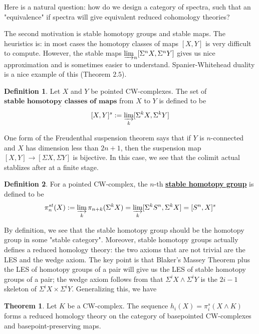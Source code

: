 \documentclass{article}
\theoremstyle{definition}
\newtheorem{theorem}{Theorem}[section]
\theoremstyle{definition}
\newtheorem{definition}{Definition}[theorem]
\theoremstyle{definition}
\theoremstyle{definition}
\theoremstyle{definition}
\theoremstyle{definition}
\theoremstyle{definition}
\begin{document}
Here is a natural question: how do we design a category of spectra, such that an "equivalence" if spectra will give equivalent reduced cohomology theories?

The second motivation is stable homotopy groups and stable maps. The heuristics is: in most cases the homotopy classes of maps $[X,Y]$ is very difficult to compute. However, the stable maps $\varinjlim_n[\Sigma^nX,\Sigma^n Y]$ gives us nice approximation and is sometimes easier to understand. Spanier-Whitehead duality is a nice example of this (Theorem $2.5$). 


\begin{tcolorbox}[colback=purple!5!white,colframe=purple!75!black]
\begin{definition}
Let $X$ and $Y$ be pointed CW-complexes. The set of $\underline{\textbf{stable homotopy classes of maps}}$ from $X$ to $Y$ is defined to be 
\[[X,Y]^s:= \varinjlim_{k}[\Sigma^k X, \Sigma^k Y] \]
\end{definition}
\end{tcolorbox}
One form of the Freudenthal suspension theorem says that if $Y$ is $n$-connected and $X$ has dimension less than $2n+1$, then the suspension map $[X,Y]\to [\Sigma X,\Sigma Y]$ is bijective. In this case, we see that the colimit actual stablizes after at a finite stage. 

\begin{tcolorbox}[colback=purple!5!white,colframe=purple!75!black]
\begin{definition}
For a pointed CW-complex, the $n$-th \underline{\textbf{stable homotopy group}} is defined to be 
\[\pi_n^{st}(X):=\varinjlim_{k}\pi_{n+k}(\Sigma^k X)=\varinjlim_{k}[\Sigma^k S^n, \Sigma^k X]=[S^n,X]^s\]
\end{definition}
\end{tcolorbox}
By definition, we see that the stable homotopy group should be the homotopy group in some "stable category". Moreover, stable homotopy groups actually defines a reduced homology theory: the two axioms that are not trivial are the LES and the wedge axiom. The key point is that Blaker's Massey Theorem plus the LES of homotopy groups of a pair will give us the LES of stable homotopy groups of a pair; the wedge axiom follows from that $\Sigma^i X\wedge \Sigma^i Y$ is the $2i-1$ skeleton of  $\Sigma^i X\times \Sigma^i Y$. Generalizing this, we have 

\begin{tcolorbox}[colback=red!5!white,colframe=red!30!white]
\begin{theorem}
    Let $K$ be a CW-complex. The sequence $h_i(X) = \pi^s_i(X \wedge K)$ forms a reduced homology theory on the category of basepointed CW-complexes and basepoint-preserving maps.
\end{theorem}
\end{tcolorbox}
\end{document}
